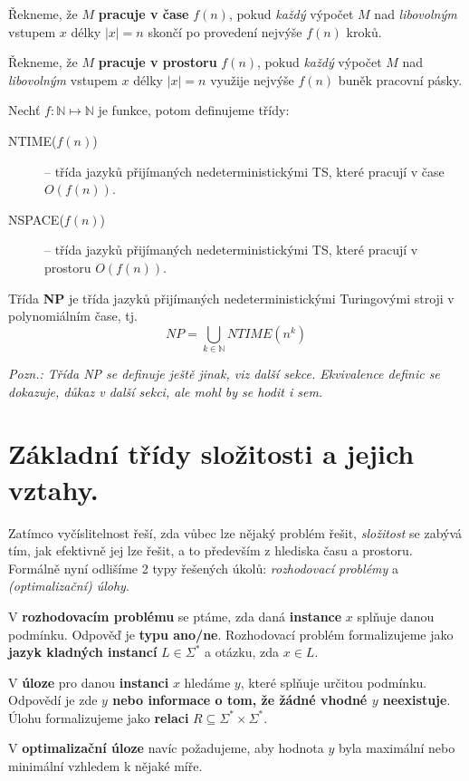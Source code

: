 \documentclass[11pt]{report} %
\newcommand{\N}{\mathbb{N}}
\begin{document}
Řekneme, že $M$ \textbf{pracuje v čase} $f(n)$, pokud \textit{každý} výpočet $M$ nad \textit{libovolným} vstupem $x$ délky $|x| = n$ skončí po provedení nejvýše $f(n)$ kroků.

Řekneme, že $M$ \textbf{pracuje v prostoru} $f(n)$, pokud \textit{každý} výpočet $M$ nad \textit{libovolným} vstupem $x$ délky $|x| = n$ využije nejvýše $f(n)$ buněk pracovní pásky.

Nechť $f : \N \mapsto \N$ je funkce, potom definujeme třídy:
\begin{description}
	\item[NTIME($f(n)$)] – třída jazyků přijímaných nedeterministickými TS, které pracují v čase $O(f(n))$.
	\item[NSPACE($f(n)$)] – třída jazyků přijímaných nedeterministickými TS, které pracují v prostoru $O(f(n))$.
\end{description}

Třída \textbf{NP} je třída jazyků přijímaných nedeterministickými Turingovými stroji v polynomiálním čase, tj. 
$$NP = \bigcup_{k\in\N}NTIME(n^k) $$

\textit{Pozn.: Třída NP se definuje ještě jinak, viz další sekce. Ekvivalence definic se dokazuje, důkaz v další sekci, ale mohl by se hodit i sem.}

\section{Základní třídy složitosti a jejich vztahy.}
Zatímco vyčíslitelnost řeší, zda vůbec lze nějaký problém řešit, \textit{složitost} se zabývá tím, jak efektivně jej lze řešit, a to především z hlediska času a prostoru. Formálně nyní odlišíme 2 typy řešených úkolů: \textit{rozhodovací problémy} a \textit{(optimalizační) úlohy}.

V \textbf{rozhodovacím problému} se ptáme, zda daná \textbf{instance} $x$ splňuje danou podmínku. Odpověď je \textbf{typu ano/ne}. Rozhodovací problém formalizujeme jako \textbf{jazyk kladných instancí} $L \in \Sigma^*$  a otázku, zda $x \in L.$

V \textbf{úloze} pro danou \textbf{instanci} $x$ hledáme $y$, které splňuje určitou podmínku. Odpovědí je zde  \textbf{$y$ nebo informace o tom, že žádné vhodné $y$ neexistuje}. Úlohu formalizujeme jako \textbf{relaci} $R \subseteq \Sigma^* \times \Sigma^*$.

V \textbf{optimalizační úloze} navíc požadujeme, aby hodnota $y$ byla maximální nebo minimální vzhledem k nějaké míře.
\end{document}
